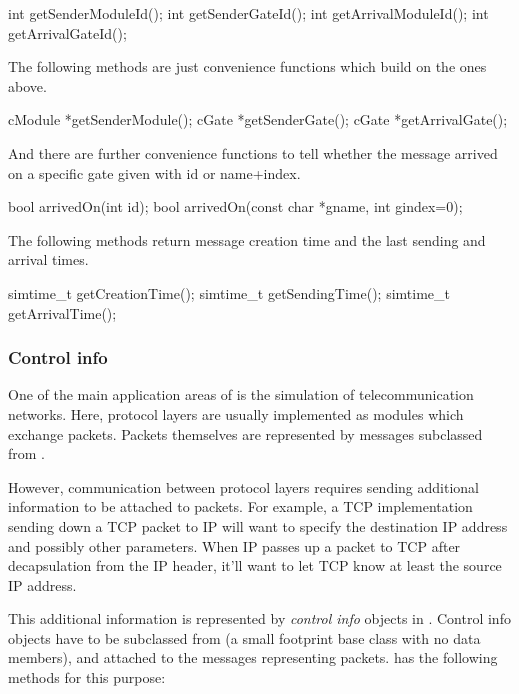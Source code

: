 \begin{cpp}
int getSenderModuleId();
int getSenderGateId();
int getArrivalModuleId();
int getArrivalGateId();
\end{cpp}

The following methods are just convenience functions which build
on the ones above.

\begin{cpp}
cModule *getSenderModule();
cGate *getSenderGate();
cGate *getArrivalGate();
\end{cpp}

And there are further convenience functions to tell whether
the message arrived on a specific gate given with id or
name+index.

\begin{cpp}
bool arrivedOn(int id);
bool arrivedOn(const char *gname, int gindex=0);
\end{cpp}

The following methods return message creation time and the last sending
and arrival times.

\begin{cpp}
simtime_t getCreationTime();
simtime_t getSendingTime();
simtime_t getArrivalTime();
\end{cpp}

\subsubsection{Control info}

One of the main application areas of {\opp} is the simulation of
telecommunication networks. Here, protocol layers are usually
implemented as modules which exchange packets. Packets themselves
are represented by messages subclassed from .

However, communication between protocol layers requires sending
additional information to be attached to packets. For example,
a TCP implementation sending down a TCP packet to IP will want
to specify the destination IP address and possibly
other parameters. When IP passes up a packet to TCP after
decapsulation from the IP header, it'll want to let TCP know
at least the source IP address.

This additional information is represented by \textit{control info}
objects in {\opp}. Control info objects have to be subclassed from
 (a small footprint base class with
no data members), and attached to the messages representing
packets.  has the following methods for this
purpose:

